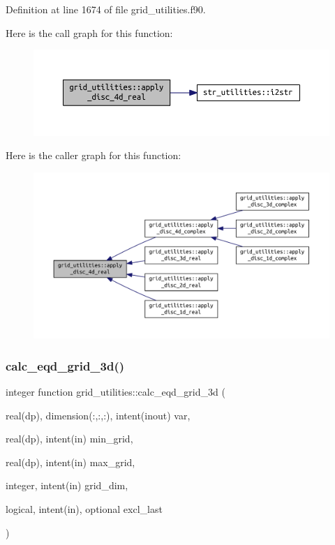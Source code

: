 Definition at line 1674 of file grid\+\_\+utilities.\+f90.

Here is the call graph for this function\+:
\nopagebreak
\begin{figure}[H]
\begin{center}
\leavevmode
\includegraphics[width=350pt]{namespacegrid__utilities_a9494e086550e67e6d1319d94d37e15ef_cgraph}
\end{center}
\end{figure}
Here is the caller graph for this function\+:
\nopagebreak
\begin{figure}[H]
\begin{center}
\leavevmode
\includegraphics[width=350pt]{namespacegrid__utilities_a9494e086550e67e6d1319d94d37e15ef_icgraph}
\end{center}
\end{figure}
\mbox{\label{namespacegrid__utilities_a1725fdd7bdf52d436152c5e327c36be4}} 
\subsubsection{\texorpdfstring{calc\+\_\+eqd\+\_\+grid\+\_\+3d()}{calc\_eqd\_grid\_3d()}}
{\footnotesize\ttfamily integer function grid\+\_\+utilities\+::calc\+\_\+eqd\+\_\+grid\+\_\+3d (\begin{DoxyParamCaption}\item[{real(dp), dimension(\+:,\+:,\+:), intent(inout)}]{var,  }\item[{real(dp), intent(in)}]{min\+\_\+grid,  }\item[{real(dp), intent(in)}]{max\+\_\+grid,  }\item[{integer, intent(in)}]{grid\+\_\+dim,  }\item[{logical, intent(in), optional}]{excl\+\_\+last }\end{DoxyParamCaption})}



